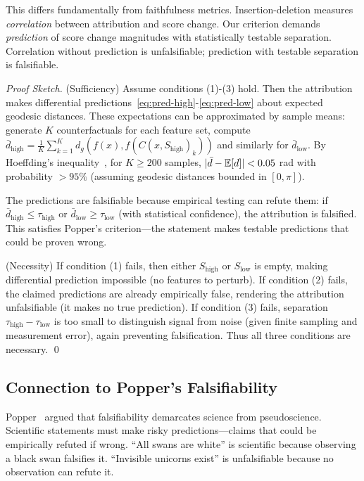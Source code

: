 This differs fundamentally from faithfulness metrics. Insertion-deletion measures \emph{correlation} between attribution and score change. Our criterion demands \emph{prediction} of score change magnitudes with statistically testable separation. Correlation without prediction is unfalsifiable; prediction with testable separation is falsifiable.

\begin{proof}[Proof Sketch]
(Sufficiency) Assume conditions (1)-(3) hold. Then the attribution makes differential predictions~\eqref{eq:pred-high}-\eqref{eq:pred-low} about expected geodesic distances. These expectations can be approximated by sample means: generate $K$ counterfactuals for each feature set, compute $\bar{d}_{\text{high}} = \frac{1}{K} \sum_{k=1}^K d_g(f(x), f(C(x, S_{\text{high}})_k))$ and similarly for $\bar{d}_{\text{low}}$. By Hoeffding's inequality~\citep{hoeffding1963probability}, for $K \geq 200$ samples, $|\bar{d} - \mathbb{E}[d]| < 0.05$ rad with probability $>95\%$ (assuming geodesic distances bounded in $[0, \pi]$).

The predictions are falsifiable because empirical testing can refute them: if $\bar{d}_{\text{high}} \leq \tau_{\text{high}}$ or $\bar{d}_{\text{low}} \geq \tau_{\text{low}}$ (with statistical confidence), the attribution is falsified. This satisfies Popper's criterion—the statement makes testable predictions that could be proven wrong.

(Necessity) If condition (1) fails, then either $S_{\text{high}}$ or $S_{\text{low}}$ is empty, making differential prediction impossible (no features to perturb). If condition (2) fails, the claimed predictions are already empirically false, rendering the attribution unfalsifiable (it makes no true prediction). If condition (3) fails, separation $\tau_{\text{high}} - \tau_{\text{low}}$ is too small to distinguish signal from noise (given finite sampling and measurement error), again preventing falsification. Thus all three conditions are necessary. \qed
\end{proof}

\subsection{Connection to Popper's Falsifiability}

Popper~\citep{popper1959logic} argued that falsifiability demarcates science from pseudoscience. Scientific statements must make risky predictions—claims that could be empirically refuted if wrong. ``All swans are white'' is scientific because observing a black swan falsifies it. ``Invisible unicorns exist'' is unfalsifiable because no observation can refute it.

